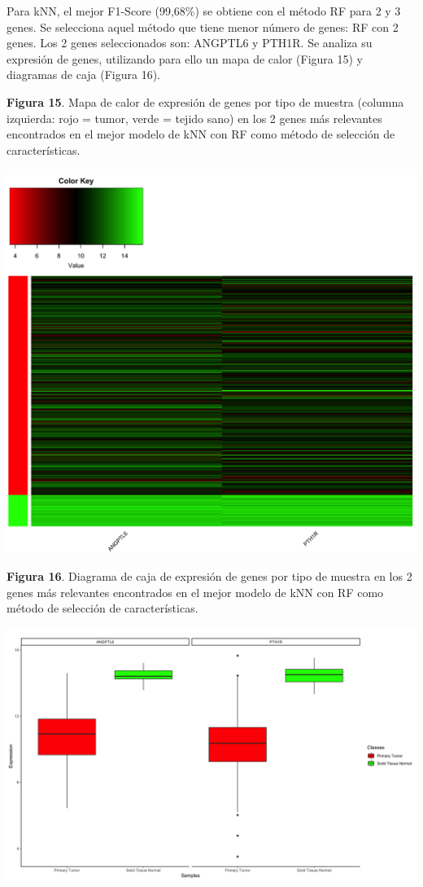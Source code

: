 Para kNN, el mejor F1-Score (99,68\%) se obtiene con el método RF para 2 y 3 genes. Se selecciona aquel método que tiene menor número de genes: RF con 2 genes. Los 2 genes seleccionados son: ANGPTL6 y PTH1R. Se analiza su expresión de genes, utilizando para ello un mapa de calor (Figura 15) y diagramas de caja (Figura 16).

\newpage
\textbf{Figura 15}. Mapa de calor de expresión de genes por tipo de muestra (columna izquierda: rojo = tumor, verde = tejido sano) en los 2 genes más relevantes encontrados en el mejor modelo de kNN con RF como método de selección de características.
\begin{center}
	\includegraphics[width=1\textwidth]{figuras/15_higado_biclase_42_knn_heatmap_mejor_metodo.png} 
\end{center}

\newpage
\textbf{Figura 16}. Diagrama de caja de expresión de genes por tipo de muestra en los 2 genes más relevantes encontrados en el mejor modelo de kNN con RF como método de selección de características.
\begin{center}
	\includegraphics[width=1\textwidth]{figuras/16_higado_biclase_43_knn_boxplots_mejor_metodo.png} 
\end{center}

